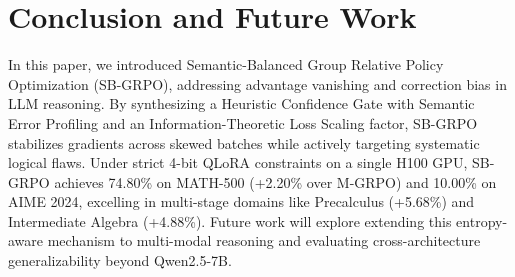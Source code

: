 \section{Conclusion and Future Work}
In this paper, we introduced Semantic-Balanced Group Relative Policy Optimization (SB-GRPO), addressing advantage vanishing and correction bias in LLM reasoning. By synthesizing a Heuristic Confidence Gate with Semantic Error Profiling and an Information-Theoretic Loss Scaling factor, SB-GRPO stabilizes gradients across skewed batches while actively targeting systematic logical flaws. Under strict 4-bit QLoRA constraints on a single H100 GPU, SB-GRPO achieves 74.80\% on MATH-500 (+2.20\% over M-GRPO) and 10.00\% on AIME 2024, excelling in multi-stage domains like Precalculus (+5.68\%) and Intermediate Algebra (+4.88\%). Future work will explore extending this entropy-aware mechanism to multi-modal reasoning and evaluating cross-architecture generalizability beyond Qwen2.5-7B.